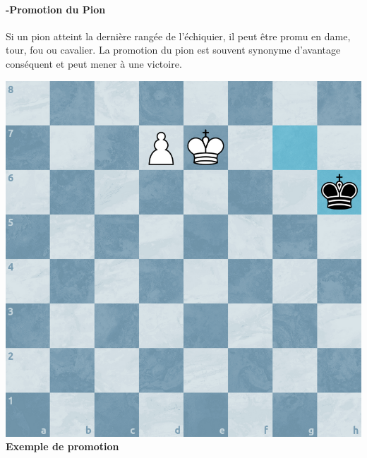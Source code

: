 \documentclass{article}
\begin{document}
\paragraph{-Promotion du Pion} Si un pion atteint la dernière rangée de l’échiquier, il peut être promu en dame,
 tour, fou ou cavalier. La promotion du pion est souvent synonyme d’avantage conséquent et peut mener à une victoire.

 \noindent
 \begin{minipage}{0.48\textwidth}
     \centering
     \includegraphics[width=\textwidth, height=\textwidth]{promotion1.png}
     \vspace{0.5cm}
    \textbf{Exemple de promotion}
 \end{minipage}
 \hfill
\end{document}
